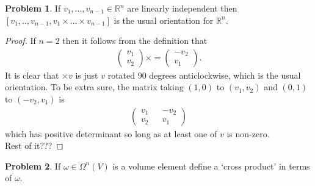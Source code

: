 \documentclass[20pt]{article}
\theoremstyle{plain}
\theoremstyle{definition}
\newtheorem*{problem}{Problem}
\newcommand{\reals}{\mathbb{R}}
\begin{document}
\begin{problem}{4.6}
  If $v_1, ..., v_{n-1} \in \reals^n$ are linearly independent then 
  $[v_1, .., v_{n-1}, v_1 \times ... \times v_{n-1}]$ is the usual 
  orientation for $\reals^n$.
\end{problem}
\begin{proof}
  If $n=2$ then it follows from the definition that 
  \begin{align*}
    \begin{pmatrix}
      v_1 \\ v_2
    \end{pmatrix}
    \times = 
    \begin{pmatrix}
      -v_2 \\ v_1
    \end{pmatrix}.
  \end{align*}
  It is clear that $\times v$ is just $v$ rotated $90$ degrees anticlockwise,
  which is the usual orientation.   To be extra sure, the matrix taking 
  $(1, 0)$ to $(v_1, v_2)$ and $(0, 1)$ to $(-v_2, v_1)$ is 
  \begin{align*}
    \begin{pmatrix}
      v_1 && -v_2 \\ v_2 && v_1
    \end{pmatrix}
  \end{align*}
  which has positive determinant so long as at least one of $v$ is non-zero. \\
  \color{ForestGreen} Rest of it???
\end{proof}
















\begin{problem}{4.8}
  If $\omega \in \Omega^n(V)$ is a volume element define a `cross product' in terms of $\omega$.
\end{problem}
\end{document}
